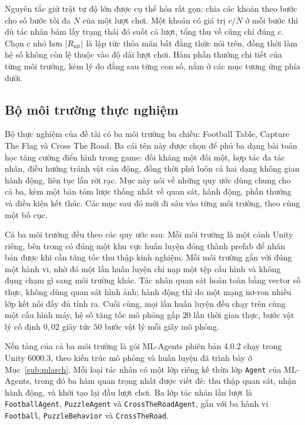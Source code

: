 \indent Nguyên tắc giữ trật tự độ lớn được cụ thể hóa rất gọn: chia các khoản theo bước cho
số bước tối đa $N$ của một lượt chơi. Một khoản có giá trị $c/N$ ở mỗi bước thì dù tác nhân
bám lấy trạng thái đó suốt cả lượt, tổng thu về cũng chỉ đúng $c$. Chọn $c$ nhỏ hơn
$|R_{\mathrm{mt}}|$ là lập tức thỏa mãn bất đẳng thức nói trên, đồng thời làm hệ số không
còn lệ thuộc vào độ dài lượt chơi. Hàm phần thưởng chi tiết của từng môi trường, kèm lý do
đằng sau từng con số, nằm ở các mục tương ứng phía dưới.

\subsection{Bộ môi trường thực nghiệm}
\label{sub:env-suite}

\indent Bộ thực nghiệm của đề tài có ba môi trường ba chiều: Football Table, Capture The
Flag và Cross The Road. Ba cái tên này được chọn để phủ ba dạng bài toán học tăng cường
điển hình trong game: đối kháng một đối một, hợp tác đa tác nhân, điều hướng tránh vật cản
động, đồng thời phủ luôn cả hai dạng không gian hành động, liên tục lẫn rời rạc.
Mục này nói về những quy ước dùng chung cho cả ba, kèm một bản tóm lược thống nhất về quan
sát, hành động, phần thưởng và điều kiện kết thúc. Các mục sau đó mới đi sâu vào từng môi
trường, theo cùng một bố cục.

\indent Cả ba môi trường đều theo các quy ước sau: Mỗi môi
trường là một cảnh Unity riêng, bên trong có đúng một khu vực huấn luyện đóng thành prefab
để nhân bản được khi cần tăng tốc thu thập kinh nghiệm. Mỗi môi trường gắn với đúng một
hành vi, nhờ đó một lần huấn luyện chỉ nạp một tệp cấu hình và không đụng chạm gì sang môi
trường khác. Tác nhân quan sát hoàn toàn bằng vector số thực, không dùng quan sát hình
ảnh; hành động thì do một mạng nơ-ron nhiều lớp kết nối đầy đủ tính ra. Cuối cùng, mọi lần
huấn luyện đều chạy trên cùng một cấu hình máy, hệ số tăng tốc mô phỏng gấp $20$ lần thời gian
thực, bước vật lý cố định $0{,}02$ giây tức $50$ bước vật lý mỗi giây mô
phỏng.

\indent Nền tảng của cả ba môi trường là gói ML-Agents phiên bản 4.0.2 chạy trong Unity
6000.3, theo kiến trúc mô phỏng và huấn luyện đã trình bày ở Mục~\ref{sub:mlarch}. Mỗi loại
tác nhân có một lớp riêng kế thừa lớp \texttt{Agent} của ML-Agents, trong đó ba hàm quan
trọng nhất được viết đè: thu thập quan sát, nhận hành động, và khởi tạo lại đầu lượt chơi.
Ba lớp tác nhân lần lượt là \texttt{FootballAgent}, \texttt{PuzzleAgent} và
\texttt{CrossTheRoadAgent}, gắn với ba hành vi \texttt{Football}, \texttt{PuzzleBehavior}
và \texttt{CrossTheRoad}.

